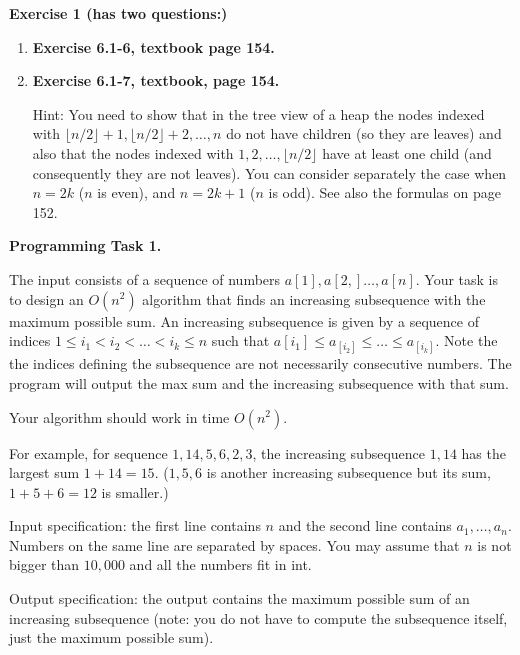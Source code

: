 \documentclass[11pt]{article}
\begin{document}
%

\textbf{Exercise 1 (has two questions:)}
\begin{enumerate}
\item \textbf{Exercise 6.1-6, textbook page 154.} 



\item \textbf{Exercise 6.1-7, textbook, page 154.} 

Hint: You need to show that in the tree view of a heap  the nodes indexed with $\lfloor n/2 \rfloor +1,  \lfloor n/2 \rfloor +2, \ldots, n$ do not have children (so they are leaves) and also that the nodes indexed with $1, 2, \ldots, \lfloor n/2 \rfloor$ have at least one child (and consequently they are not leaves). You can consider separately the case when $n=2k$ ($n$ is even), and $n=2k+1$ ($n$ is odd). See also the formulas on page 152.
\end{enumerate}
\bigskip



\textbf{Programming Task 1.}

The input consists of  a sequence of numbers $a[1], a[2,] \ldots, a[n]$. Your task is to design an $O(n^2)$ algorithm that finds an
increasing subsequence with the maximum possible sum. An increasing subsequence  is given by a sequence of indices $1 \leq i_1 < i_2 < \ldots < i_k \leq n$ such  that $a[i_1]  \leq a_[i_2] \leq \ldots \leq a_[i_k]$. Note the the indices defining the subsequence are not necessarily consecutive numbers. The program will output the max sum and the increasing subsequence with that sum.

Your algorithm should work in time $O(n^2)$.

For example, for sequence $1, 14, 5,  6, 2, 3$, the increasing subsequence $1, 14$  has the largest sum $1 + 14 = 15$. ($1,5,6$ is another increasing subsequence but its sum, $1+5+6 = 12$ is smaller.)


Input specification: the first line contains $n$ and the second line contains $a_1, \ldots, a_n$. Numbers on the same line are separated by spaces. You may assume that $n$ is not bigger than $10,000$ and all the numbers fit in int. 

Output specification: the output contains the maximum possible sum of an increasing subsequence (note: you do not have to compute the subsequence itself, just the maximum possible sum). 
\end{document}
